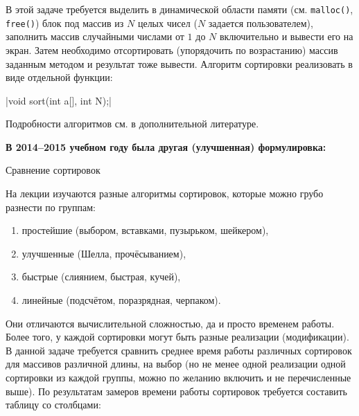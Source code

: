 
В этой задаче требуется выделить в динамической области памяти 
(см. \texttt{malloc()}, \texttt{free()}) блок под 
массив из $N$ целых чисел ($N$ задается пользователем), заполнить массив
случайными числами от $1$ до $N$ включительно и вывести его на экран. Затем 
необходимо отсортировать (упорядочить по возрастанию) массив заданным методом 
и результат тоже вывести. Алгоритм сортировки реализовать в виде отдельной функции:

\zzmintinline|void sort(int a[], int N);|

Подробности алгоритмов см. в дополнительной литературе.

\textbf{В 2014--2015 учебном году была другая (улучшенная) формулировка:}

Сравнение сортировок

На лекции изучаются разные алгоритмы сортировок, которые можно грубо разнести по группам:
%
\begin{enumerate}
\item простейшие (выбором, вставками, пузырьком, шейкером),
\item улучшенные (Шелла, прочёсыванием),
\item быстрые (слиянием, быстрая, кучей),
\item линейные (подсчётом, поразрядная, черпаком).
\end{enumerate}
%
Они отличаются вычислительной сложностью, да и просто временем работы. Более
того, у каждой сортировки могут быть разные реализации (модификации). В данной
задаче требуется сравнить среднее время работы различных сортировок для
массивов различной длины, на выбор (но не менее одной реализации одной
сортировки из каждой группы, можно по желанию включить и не перечисленные
выше). По результатам замеров времени работы сортировок требуется составить
таблицу со столбцами:

